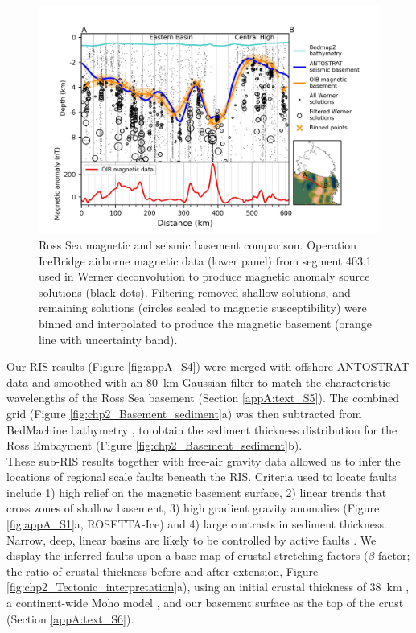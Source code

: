 \begin{figure}
    \includegraphics[width=\textwidth]{figures/chp2/Fig2_OIB_403_1.jpg}
    \caption[Ross Sea magnetic and seismic basement comparison]{Ross Sea magnetic and seismic basement comparison. Operation IceBridge airborne magnetic data (lower panel) from segment 403.1 used in Werner deconvolution to produce magnetic anomaly source solutions (black dots). Filtering removed shallow solutions, and remaining solutions (circles scaled to magnetic susceptibility) were binned and interpolated to produce the magnetic basement (orange line with uncertainty band).}
    \label{fig:chp2_OIB_403_1}
\end{figure}

Our RIS results (Figure \ref{fig:appA_S4}) were merged with offshore ANTOSTRAT data \citep{brancolinidescriptive1995} and smoothed with an 80~km Gaussian filter to match the characteristic wavelengths of the Ross Sea basement (Section \ref{appA:text_S5}). The combined grid (Figure \ref{fig:chp2_Basement_sediment}a) was then subtracted from BedMachine bathymetry \citep[Figure \ref{fig:chp2_Bathy_Mag}a, Section \ref{appA:text_S6},][]{morlighemdeep2020}, to obtain the sediment thickness distribution for the Ross Embayment (Figure \ref{fig:chp2_Basement_sediment}b).\\

These sub-RIS results together with free-air gravity data allowed us to infer the locations of regional scale faults beneath the RIS. Criteria used to locate faults include 1) high relief on the magnetic basement surface, 2) linear trends that cross zones of shallow basement, 3) high gradient gravity anomalies (Figure \ref{fig:appA_S1}a, ROSETTA-Ice) and 4) large contrasts in sediment thickness. Narrow, deep, linear basins are likely to be controlled by active faults \citep[e.g.][]{finnexamples2002, drenthshallow2019}. We display the inferred faults upon a base map of crustal stretching factors ($\beta$-factor; the ratio of crustal thickness before and after extension, Figure \ref{fig:chp2_Tectonic_interpretation}a), using an initial crustal thickness of 38~km \citep{müllereocene2007}, a continent-wide Moho model \citep{ansvelocity2015}, and our basement surface as the top of the crust (Section \ref{appA:text_S6}).


